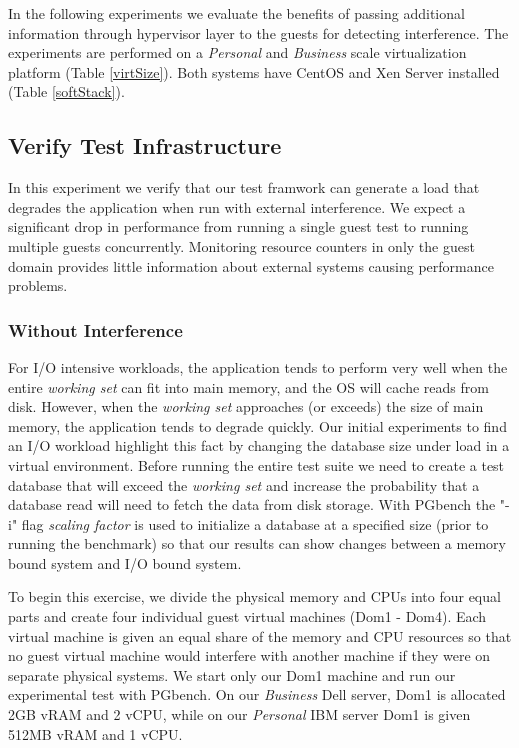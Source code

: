 In the following experiments we evaluate the benefits of passing additional information through hypervisor layer to the  guests for detecting interference.  The experiments are performed on a \emph{Personal} and \emph{Business} scale virtualization platform (Table \ref{virtSize}).  Both systems have CentOS and Xen Server installed (Table \ref{softStack}).

\subsection{Verify Test Infrastructure}
In this experiment we verify that our test framwork can generate a load that degrades the application when run with external interference.  We expect a significant drop in performance from running a single guest test to running multiple guests concurrently.  Monitoring resource counters in only the guest domain provides little information about external systems causing performance problems. 

\subsubsection{Without Interference}
For I/O intensive workloads, the application tends to perform very well when the entire \emph{working set} can fit into main memory, and the OS will cache reads from disk.  However, when the \emph{working set}  approaches (or exceeds) the size of main memory, the application tends to degrade quickly.  Our initial experiments to find an I/O workload highlight this fact by changing the database size under load in a virtual environment.  Before running the entire test suite we need to create a test database that will exceed the \emph{working set} and increase the probability that a database read will need to fetch the data from disk storage.  With PGbench the "-i" flag \emph{scaling factor} is used to initialize a database at a specified size (prior to running the benchmark) so that our results can show changes between a memory bound system and I/O bound system.  


To begin this exercise, we divide the physical memory and CPUs into four equal parts and create four individual guest virtual machines (Dom1 - Dom4).  
Each virtual machine is given an equal share of the memory and CPU resources so that no guest virtual machine would interfere with another machine if they were on separate physical systems.  
We start only our Dom1 machine and run our experimental test with PGbench.  
On our \emph{Business} Dell server, Dom1 is allocated 2GB vRAM and 2 vCPU, while on our \emph{Personal} IBM server Dom1 is given 512MB vRAM and 1 vCPU.  

